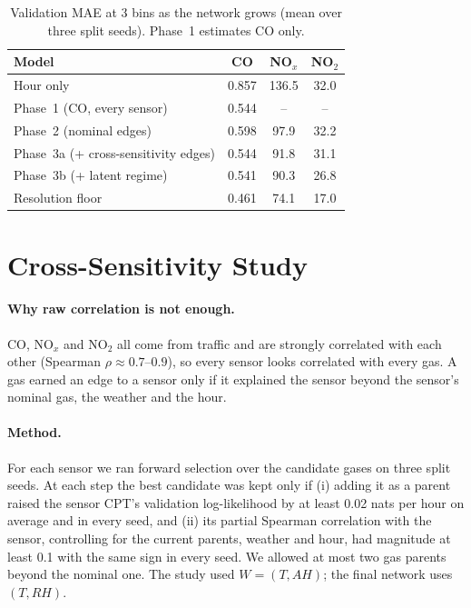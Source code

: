 \begin{table}[h]
  \centering
  \caption{Validation MAE at 3 bins as the network grows (mean over three
  split seeds). Phase~1 estimates CO only.}
  \label{tab:ladder}
  \small
  \begin{tabular}{lccc}
    \toprule
    Model & CO & NO$_x$ & NO$_2$ \\
    \midrule
    Hour only                            & 0.857 & 136.5 & 32.0 \\
    Phase~1 (CO, every sensor)           & 0.544 & --    & --   \\
    Phase~2 (nominal edges)              & 0.598 & 97.9  & 32.2 \\
    Phase~3a (+ cross-sensitivity edges) & 0.544 & 91.8  & 31.1 \\
    Phase~3b (+ latent regime)           & 0.541 & 90.3  & 26.8 \\
    \midrule
    Resolution floor                     & 0.461 & 74.1  & 17.0 \\
    \bottomrule
  \end{tabular}
\end{table}


\FloatBarrier
\section{Cross-Sensitivity Study}
\label{app:cross}

\paragraph{Why raw correlation is not enough.} CO, NO$_x$ and NO$_2$ all come
from traffic and are strongly correlated with each other (Spearman
$\rho \approx 0.7$--$0.9$), so every sensor looks correlated with every gas.
A gas earned an edge to a sensor only if it explained the sensor beyond the
sensor's nominal gas, the weather and the hour.

\paragraph{Method.} For each sensor we ran forward selection over the candidate
gases on three split seeds. At each step the best candidate was kept only if
(i) adding it as a parent raised the sensor CPT's validation log-likelihood by
at least 0.02 nats per hour on average and in every seed, and (ii) its partial
Spearman correlation with the sensor, controlling for the current parents,
weather and hour, had magnitude at least 0.1 with the same sign in every seed.
We allowed at most two gas parents beyond the nominal one. The study used
$W = (T, \mathit{AH})$; the final network uses $(T, \mathit{RH})$.

